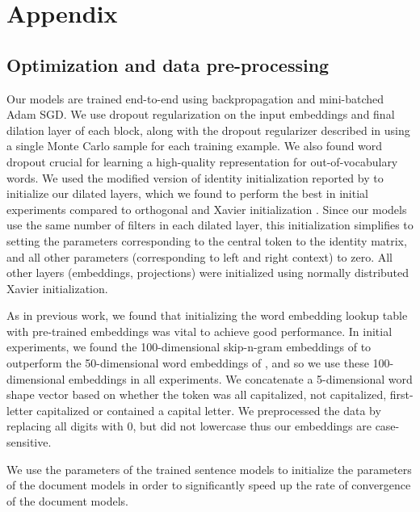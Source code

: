\documentclass[11pt,letterpaper]{article}
\begin{document}



\clearpage
\newpage

\appendix

\section{Appendix}

\subsection{Optimization and data pre-processing}
Our models are trained end-to-end using backpropagation and mini-batched Adam \citep{kingma2014adam} SGD. We use dropout regularization \citep{srivastava2014dropout} on the input embeddings and final dilation layer of each block, along with the dropout regularizer described in \citet{ma2017dropout} using a single Monte Carlo sample for each training example. We also found word dropout \citep{dai2015semi,lample2016neural} crucial for learning a high-quality representation for out-of-vocabulary words. We used the modified version of identity initialization \citep{le2015simple} reported by \citet{yu2015multi} to initialize our dilated layers, which we found to perform the best in initial experiments compared to orthogonal and Xavier initialization \citep{glorot2010understanding}. Since our models use the same number of filters in each dilated layer, this initialization simplifies to setting the parameters corresponding to the central token to the identity matrix, and all other parameters (corresponding to left and right context) to zero. All other layers (embeddings, projections) were initialized using normally distributed Xavier initialization. 

As in previous work, we found that initializing the word embedding lookup table with pre-trained embeddings was vital to achieve good performance. In initial experiments, we found the 100-dimensional skip-n-gram \citep{wang2015not} embeddings of \citet{lample2016neural} to outperform the 50-dimensional word embeddings of \citet{collobert2011natural}, and so we use these 100-dimensional embeddings in all experiments. We concatenate a 5-dimensional word shape vector based on whether the token was all capitalized, not capitalized, first-letter capitalized or contained a capital letter. We preprocessed the data by replacing all digits with 0, but did not lowercase thus our embeddings are case-sensitive.

We use the parameters of the trained sentence models to initialize the parameters of the document models in order to significantly speed up the rate of convergence of the document models. 
\end{document}
